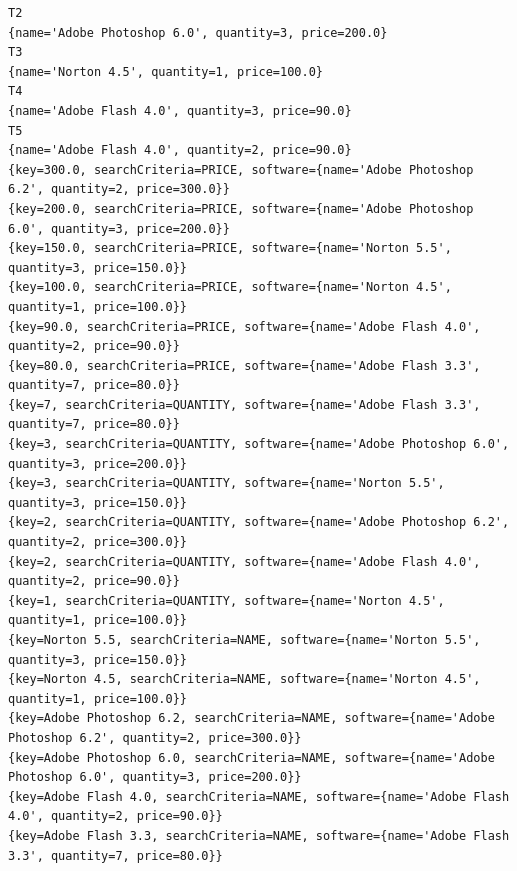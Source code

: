\documentclass[a4paper]{article}
\begin{document}
\begin{large}
\begin{lstlisting}
T2
{name='Adobe Photoshop 6.0', quantity=3, price=200.0}
T3
{name='Norton 4.5', quantity=1, price=100.0}
T4
{name='Adobe Flash 4.0', quantity=3, price=90.0}
T5
{name='Adobe Flash 4.0', quantity=2, price=90.0}
{key=300.0, searchCriteria=PRICE, software={name='Adobe Photoshop 6.2', quantity=2, price=300.0}}
{key=200.0, searchCriteria=PRICE, software={name='Adobe Photoshop 6.0', quantity=3, price=200.0}}
{key=150.0, searchCriteria=PRICE, software={name='Norton 5.5', quantity=3, price=150.0}}
{key=100.0, searchCriteria=PRICE, software={name='Norton 4.5', quantity=1, price=100.0}}
{key=90.0, searchCriteria=PRICE, software={name='Adobe Flash 4.0', quantity=2, price=90.0}}
{key=80.0, searchCriteria=PRICE, software={name='Adobe Flash 3.3', quantity=7, price=80.0}}
{key=7, searchCriteria=QUANTITY, software={name='Adobe Flash 3.3', quantity=7, price=80.0}}
{key=3, searchCriteria=QUANTITY, software={name='Adobe Photoshop 6.0', quantity=3, price=200.0}}
{key=3, searchCriteria=QUANTITY, software={name='Norton 5.5', quantity=3, price=150.0}}
{key=2, searchCriteria=QUANTITY, software={name='Adobe Photoshop 6.2', quantity=2, price=300.0}}
{key=2, searchCriteria=QUANTITY, software={name='Adobe Flash 4.0', quantity=2, price=90.0}}
{key=1, searchCriteria=QUANTITY, software={name='Norton 4.5', quantity=1, price=100.0}}
{key=Norton 5.5, searchCriteria=NAME, software={name='Norton 5.5', quantity=3, price=150.0}}
{key=Norton 4.5, searchCriteria=NAME, software={name='Norton 4.5', quantity=1, price=100.0}}
{key=Adobe Photoshop 6.2, searchCriteria=NAME, software={name='Adobe Photoshop 6.2', quantity=2, price=300.0}}
{key=Adobe Photoshop 6.0, searchCriteria=NAME, software={name='Adobe Photoshop 6.0', quantity=3, price=200.0}}
{key=Adobe Flash 4.0, searchCriteria=NAME, software={name='Adobe Flash 4.0', quantity=2, price=90.0}}
{key=Adobe Flash 3.3, searchCriteria=NAME, software={name='Adobe Flash 3.3', quantity=7, price=80.0}}


\end{lstlisting}
\end{large}
\end{document}
